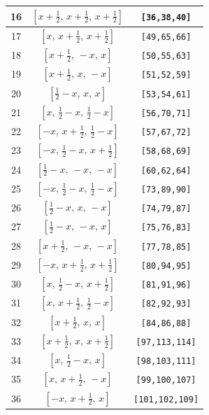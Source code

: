 \documentclass[fleqn,8pt]{jsarticle}
\begin{document}
\begin{longtable}{ccc}
16 & $\left[ x + \frac{1}{2},\, x + \frac{1}{2},\, x + \frac{1}{2} \right]$ & {\tt [36,38,40]} \\ \hline
17 & $\left[ x,\, x + \frac{1}{2},\, x + \frac{1}{2} \right]$ & {\tt [49,65,66]} \\ \hline
18 & $\left[ x + \frac{1}{2},\, - x,\, x \right]$ & {\tt [50,55,63]} \\ \hline
19 & $\left[ x + \frac{1}{2},\, x,\, - x \right]$ & {\tt [51,52,59]} \\ \hline
20 & $\left[ \frac{1}{2} - x,\, x,\, x \right]$ & {\tt [53,54,61]} \\ \hline
21 & $\left[ x,\, \frac{1}{2} - x,\, \frac{1}{2} - x \right]$ & {\tt [56,70,71]} \\ \hline
22 & $\left[ - x,\, x + \frac{1}{2},\, \frac{1}{2} - x \right]$ & {\tt [57,67,72]} \\ \hline
23 & $\left[ - x,\, \frac{1}{2} - x,\, x + \frac{1}{2} \right]$ & {\tt [58,68,69]} \\ \hline
24 & $\left[ \frac{1}{2} - x,\, - x,\, - x \right]$ & {\tt [60,62,64]} \\ \hline
25 & $\left[ - x,\, \frac{1}{2} - x,\, \frac{1}{2} - x \right]$ & {\tt [73,89,90]} \\ \hline
26 & $\left[ \frac{1}{2} - x,\, x,\, - x \right]$ & {\tt [74,79,87]} \\ \hline
27 & $\left[ \frac{1}{2} - x,\, - x,\, x \right]$ & {\tt [75,76,83]} \\ \hline
28 & $\left[ x + \frac{1}{2},\, - x,\, - x \right]$ & {\tt [77,78,85]} \\ \hline
29 & $\left[ - x,\, x + \frac{1}{2},\, x + \frac{1}{2} \right]$ & {\tt [80,94,95]} \\ \hline
30 & $\left[ x,\, \frac{1}{2} - x,\, x + \frac{1}{2} \right]$ & {\tt [81,91,96]} \\ \hline
31 & $\left[ x,\, x + \frac{1}{2},\, \frac{1}{2} - x \right]$ & {\tt [82,92,93]} \\ \hline
32 & $\left[ x + \frac{1}{2},\, x,\, x \right]$ & {\tt [84,86,88]} \\ \hline
33 & $\left[ x + \frac{1}{2},\, x,\, x + \frac{1}{2} \right]$ & {\tt [97,113,114]} \\ \hline
34 & $\left[ x,\, \frac{1}{2} - x,\, x \right]$ & {\tt [98,103,111]} \\ \hline
35 & $\left[ x,\, x + \frac{1}{2},\, - x \right]$ & {\tt [99,100,107]} \\ \hline
36 & $\left[ - x,\, x + \frac{1}{2},\, x \right]$ & {\tt [101,102,109]} \\ \hline

\end{longtable}
\end{document}

